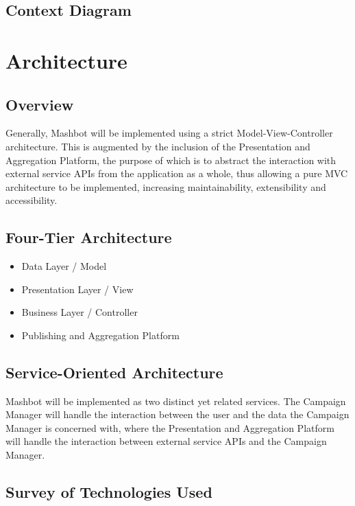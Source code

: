 \documentclass{report}
\begin{document}
\section{Context Diagram}
\chapter{Architecture}
\section{Overview}
Generally, Mashbot will be implemented using a strict Model-View-Controller architecture.  This is augmented by the inclusion of the Presentation and Aggregation Platform, the purpose of which is to abstract the interaction with external service APIs from the application as a whole, thus allowing a pure MVC architecture to be implemented, increasing maintainability, extensibility and accessibility.
\section{Four-Tier Architecture}
\begin{itemize}
\item Data Layer / Model
\item Presentation Layer / View
\item Business Layer / Controller
\item Publishing and Aggregation Platform
\end{itemize}
\section{Service-Oriented Architecture}
Mashbot will be implemented as two distinct yet related services.  The Campaign Manager will handle the interaction between the user and the data the Campaign Manager is concerned with, where the Presentation and Aggregation Platform will handle the interaction between external service APIs and the Campaign Manager.
\section{Survey of Technologies Used}
\end{document}
